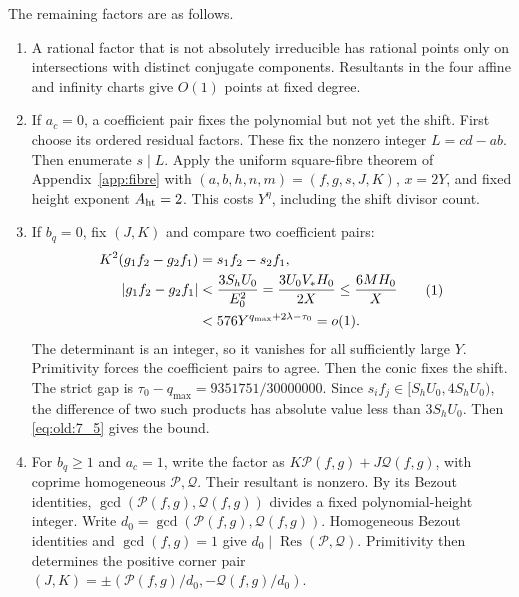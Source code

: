 The remaining factors are as follows.
\begin{enumerate}
\item A rational factor that is not absolutely irreducible has rational
points only on intersections with distinct conjugate components.
Resultants in the four affine and infinity charts give \(O(1)\) points at
fixed degree.
\item If \(a_c=0\), a coefficient pair fixes the polynomial but not yet
the shift. First choose its ordered residual factors. These fix the
nonzero integer \(L=cd-ab\). Then enumerate \(s\mid L\). Apply the
uniform square-fibre theorem of Appendix~\ref{app:fibre} with
\((a,b,h,n,m)=(f,g,s,J,K)\), \(x=2Y\), and fixed height exponent
\(A_{\rm ht}=2\). This costs \(Y^\eta\), including the shift divisor count.
\item If \(b_q=0\), fix \((J,K)\) and compare two coefficient pairs:
\[
\begin{aligned}
 K^2(g_1f_2-g_2f_1)&=s_1f_2-s_2f_1,\\
 |g_1f_2-g_2f_1|
 &<\frac{3S_hU_0}{E_0^2}
 =\frac{3U_0V_*H_0}{2X}
 \le\frac{6MH_0}{X}\\
 &<576Y^{q_{\max}+2\lambda-\tau_0}=o(1).
\end{aligned}
\AutoTag{eq:old:7_15}
\]
The determinant is an integer, so it vanishes for all sufficiently large
\(Y\). Primitivity forces the coefficient pairs to agree. Then the conic
fixes the shift. The strict gap is
\(\tau_0-q_{\max}=9351751/30000000\). Since
\(s_if_j\in[S_hU_0,4S_hU_0)\), the difference of two such products
has absolute value less than \(3S_hU_0\). Then \eqref{eq:old:7_5} gives
the bound.
\item For \(b_q\ge1\) and \(a_c=1\), write the factor as
\(K\mathcal P(f,g)+J\mathcal Q(f,g)\), with coprime homogeneous
\(\mathcal P,\mathcal Q\). Their resultant is nonzero. By its Bezout
identities,
\(\gcd(\mathcal P(f,g),\mathcal Q(f,g))\) divides a fixed
polynomial-height integer. Write
\(d_0=\gcd(\mathcal P(f,g),\mathcal Q(f,g))\). Homogeneous Bezout
identities and \(\gcd(f,g)=1\) give
\(d_0\mid\operatorname{Res}(\mathcal P,\mathcal Q)\). Primitivity
then determines the positive corner pair
\((J,K)=\pm(\mathcal P(f,g)/d_0,-\mathcal Q(f,g)/d_0)\).


\end{enumerate}
